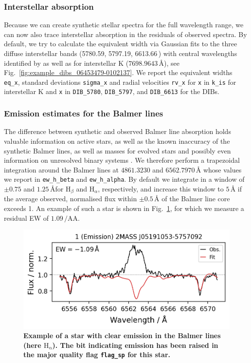 \documentclass[
  journal=pasa,
  manuscript=research-paper, %
  year=2023,
  volume=37
]{cup-journal}
\newcommand{\Angstroem}{\,\text{\AA}}	%
\begin{document}
\subsubsection{Interstellar absorption}

Because we can create synthetic stellar spectra for the full wavelength range, we can now also trace interstellar absorption in the residuals of observed spectra. By default, we try to calculate the equivalent width via Gaussian fits to the three diffuse interstellar bands (5780.59, 5797.19, 6613.66\Angstroem) with central wavelengths identified by \citet{Vogrincic2023} as well as for interstellar K ($7698.9643\,\text{\AA}$), see Fig.~\ref{fig:example_dibs_06453479-0102137}. We report the equivalent widths \texttt{eq\_x}, standard deviations \texttt{sigma\_x} and radial velocities \texttt{rv\_x} for \texttt{x} in \texttt{k\_is} for interstellar K and \texttt{x} in \texttt{DIB\_5780}, \texttt{DIB\_5797}, and \texttt{DIB\_6613} for the DIBs.

\subsubsection{Emission estimates for the Balmer lines}

The difference between synthetic and observed Balmer line absorption holds valuable information on active stars, as well as the known inaccuracy of the synthetic Balmer lines, as well as masses for evolved stars \citep{Bergemann2016} and possibly even information on unresolved binary systems \citep{Sayeed2024}. We therefore perform a trapezoidal integration around the Balmer lines at $4861.3230$ and $6562.7970\,\text{\AA}$ whose values we report in \texttt{ew\_h\_beta} and \texttt{ew\_h\_alpha}. By default we integrate in a window of $\pm 0.75$ and $1.25\,\text{\AA}$for $\text{H}_\beta$ and $\text{H}_\alpha$, respectively, and increase this window to $5\,\text{\AA}$ if the average observed, normalised flux within $\pm 0.5\,\text{\AA}$ of the Balmer line core exceeds 1. An example of such a star is shown in Fig.~\ref{fig:examples_flag_sp_1}, for which we measure a residual EW of $1.09\,\text{/AA}$.

\begin{figure}[ht]
 \centering
 \includegraphics[width=\textwidth]{figures/examples_flag_sp_1.png}
 \caption{\textbf{Example of a star with clear emission in the Balmer lines (here $\mathrm{H_{\alpha}}$). The bit indicating emission has been raised in the major quality flag \texttt{flag\_sp} for this star.}} \label{fig:examples_flag_sp_1}
\end{figure}
\end{document}
